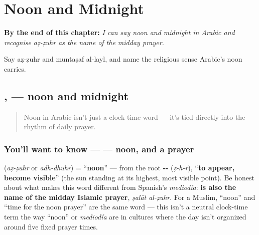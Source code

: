 
\chapter{Noon and Midnight}
\label{ch:ar-noon-and-midnight}

\begin{chapteropening}
\textbf{By the end of this chapter:} \emph{I can say noon and midnight in Arabic and recognise aẓ-ẓuhr as the name of the midday prayer.}

Say aẓ-ẓuhr and muntaṣaf al-layl, and name the religious sense Arabic's noon carries.
\end{chapteropening}

\section[\texorpdfstring{\ar{الظهر} \ar{منتصف} \ar{الليل} (aẓ-ẓuhr muntaṣaf …)}{الظهر منتصف الليل (aẓ-ẓuhr muntaṣaf …)}]{,   — noon and midnight}

\label{lesson:AR-C15-ad-duhr-muntasaf-al-layl}



\begin{quote}
Noon in Arabic isn't just a clock-time word — it's tied directly into the rhythm of daily prayer.
\end{quote}

\subsection*{You'll want to know —  — noon, and a prayer}
\textbf{} (\emph{aẓ-ẓuhr} or \emph{adh-dhuhr}) = \textquotedblleft{}\textbf{noon}\textquotedblright{} — from the root \textbf{--} (\emph{ẓ-h-r}), \textquotedblleft{}\textbf{to appear, become visible}\textquotedblright{} (the sun standing at its highest, most visible point). Be honest about what makes this word different from Spanish's \emph{mediodía}: \textbf{ is also the name of the midday Islamic prayer}, \emph{ṣalāt al-ẓuhr}. For a Muslim, \textquotedblleft{}noon\textquotedblright{} and \textquotedblleft{}time for the noon prayer\textquotedblright{} are the same word — this isn't a neutral clock-time term the way \textquotedblleft{}noon\textquotedblright{} or \emph{mediodía} are in cultures where the day isn't organized around five fixed prayer times.

